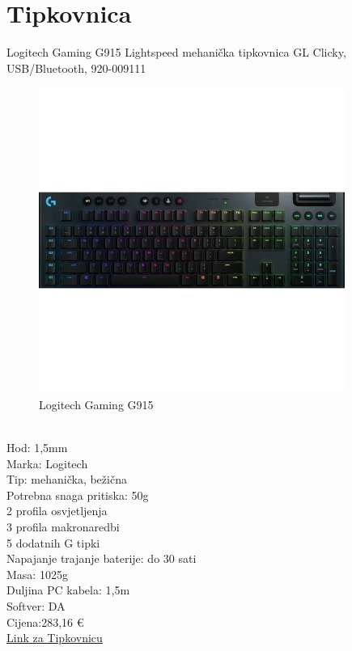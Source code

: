 \documentclass{article}
\begin{document}
\section{Tipkovnica}
Logitech Gaming G915 Lightspeed mehanička tipkovnica GL Clicky, USB/Bluetooth, 920-009111
\begin{figure}[h]
    \includegraphics[width=10cm]{tipk.jpg}
    \caption{Logitech Gaming G915}
\end{figure}\\
Hod: 1,5mm\\
Marka: Logitech\\
Tip: mehanička, bežična\\
Potrebna snaga pritiska: 50g\\
2 profila osvjetljenja\\
3 profila makronaredbi\\
5 dodatnih G tipki\\
Napajanje trajanje baterije: do 30 sati\\
Masa: 1025g\\
Duljina PC kabela: 1,5m\\
Softver: DA\\
Cijena:283,16 €\\
\href{https://www.adm.hr/logitech-gaming-g915-lightspeed-mehanicka-tipkovnica-gl-clicky-usbbluetooth-920-009111/66469/product/}{Link za Tipkovnicu}
\newpage
\end{document}
